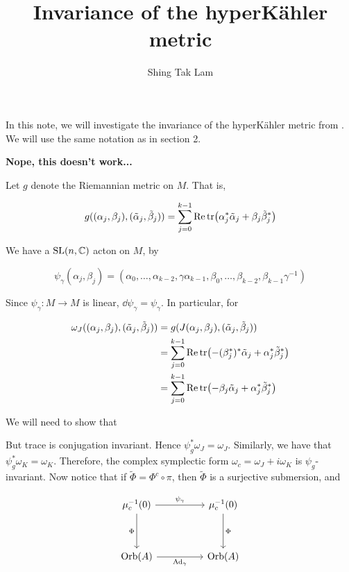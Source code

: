 \documentclass{article}
\title{Invariance of the hyperK\"ahler metric}
\author{Shing Tak Lam}
\begin{document}
\maketitle

In this note, we will investigate the invariance of the hyperK\"ahler metric from \cite{kobak_classical_1996}. We will use the same notation as in section 2.

\textbf{Nope, this doesn't work...}

Let \(g\) denote the Riemannian metric on \(M\). That is,

\[g((\alpha_j, \beta_j), (\tilde\alpha_j, \tilde\beta_j)) = \sum_{j=0}^{k-1}\Re\tr(\alpha_j^*\tilde\alpha_j + \beta_j\tilde\beta_j^*)\]

We have a \(\operatorname{SL}(n, \mathbb{C})\) acton on \(M\), by

\[\psi_\gamma(\alpha_j, \beta_j) = (\alpha_0, \dots, \alpha_{k-2}, \gamma\alpha_{k-1}, \beta_0, \dots, \beta_{k-2}, \beta_{k-1}\gamma^{-1})\]

Since \(\psi_\gamma : M \to M\) is linear, \(\dd\psi_\gamma = \psi_\gamma\). In particular, for

\begin{align*}
    \omega_J((\alpha_j, \beta_j), (\tilde\alpha_j, \tilde\beta_j)) &= g(J(\alpha_j, \beta_j), (\tilde\alpha_j, \tilde\beta_j)) \\
    &= \sum_{j=0}^{k-1}\Re\tr(-(\beta_j^*)^*\tilde\alpha_j + \alpha_j^*\tilde\beta_j^*) \\
    &= \sum_{j=0}^{k-1}\Re\tr(-\beta_j\tilde\alpha_j + \alpha_j^*\tilde\beta_j^*) \\
\end{align*}

We will need to show that



But trace is conjugation invariant. Hence \(\psi_g^*\omega_J = \omega_J\). Similarly, we have that \(\psi_g^*\omega_K = \omega_K\). Therefore, the complex symplectic form \(\omega_c = \omega_J + i\omega_K\) is \(\psi_g\)-invariant. Now notice that if \(\tilde\Phi = \Phi^c \circ \pi\), then \(\tilde\Phi\) is a surjective submersion, and

\[\begin{tikzcd}[ampersand replacement=\&]
	{\mu_c^{-1}(0)} \&\& {\mu_c^{-1}(0)} \\
	\\
	{\Orb(A)} \&\& {\Orb(A)}
	\arrow["\Phi"', from=1-1, to=3-1]
	\arrow["\Phi", from=1-3, to=3-3]
	\arrow["{\psi_\gamma}", from=1-1, to=1-3]
	\arrow["{\Ad_\gamma}"', from=3-1, to=3-3]
\end{tikzcd}\]
\end{document}

